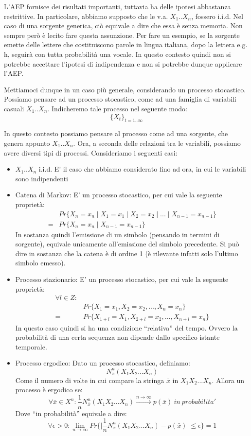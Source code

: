 L'AEP fornisce dei risultati importanti, tuttavia ha delle ipotesi abbastanza restrittive. In particolare, abbiamo supposto che le v.a. 
$X_1..X_n$, fossero i.i.d. Nel caso di una sorgente generica, ciò equivale a dire che essa è senza memoria. Non sempre però è lecito fare questa assunzione. Per fare un esempio, se la sorgente emette delle lettere che costituiscono parole in lingua italiana, dopo la lettera e.g. h, seguirà con tutta probabilità una vocale. In questo contesto quindi non si potrebbe accettare l'ipotesi di indipendenza e non si potrebbe dunque applicare l'AEP.

Mettiamoci dunque in un caso più generale, considerando un processo stocastico. Possiamo pensare ad un processo stocastico, come ad una famiglia di variabili casuali $X_1..X_n$. Indicheremo tale processo nel seguente modo:
\[
 \{X_t\}_{t=1..\infty}
\]

In questo contesto possiamo pensare al processo come ad una sorgente, che genera appunto $X_1..X_n$. Ora, a seconda delle relazioni 
tra le variabili, possiamo avere diversi tipi di processi. Consideriamo i seguenti casi:
\begin{itemize}
 \item $X_1..X_n$ i.i.d. E' il caso che abbiamo considerato fino ad ora, in cui le variabili sono indipendenti
 \item Catena di Markov: E' un processo stocastico, per cui vale la seguente proprietà:
  \[\begin{split}
   &Pr\{ X_n=x_n \mid X_1=x_1 \mid X_2=x_2 \mid ... \mid X_{n-1}=x_{n-1}\} \\
   =&Pr\{ X_n=x_n \mid X_{n-1}=x_{n-1} \}
  \end{split}
  \]
  In sostanza quindi l'emissione di un simbolo (pensando in termini di sorgente), equivale unicamente all'emissione del simbolo 
  precedente. Si può dire in sostanza che la catena è di ordine 1 (è rilevante infatti solo l'ultimo simbolo emesso).
 \item Processo stazionario: E' un processo stocastico, per cui vale la seguente proprietà:
 \[\begin{split}
  \forall l \in Z: \\ & Pr\{X_1=x_1, X_2=x_2, ... , X_n=x_n\}  \\
  = &Pr\{X_{1+l}=X_1, X_{2+l}=x_2, ... , X_{n+l}=x_n \}
    \end{split}
 \]
  In questo caso quindi si ha una condizione ``relativa'' del tempo. Ovvero la probabilità di una certa sequenza non dipende dallo
  specifico istante temporale.
 \item Processo ergodico: Dato un processo stocastico, definiamo:
 \[
  N_{\bar{x}}^n(X_1X_2...X_n) 
 \]
  Come il numero di volte in cui compare la stringa $\bar{x}$ in $X_1X_2...X_n$.
  Allora un processo è ergodico se:
 \[
  \forall \bar{x} \in X^n: \frac{1}{n} N_{\bar{x}}^n(X_1X_2...X_n) \xrightarrow{n \to \infty} p(\bar{x}) \ in \ probabilita'
 \]
  Dove ``in probabilità'' equivale a dire:
  \[
   \forall \epsilon > 0: \lim_{n \to \infty} Pr\{ \mid \frac{1}{n} N_{\bar{x}}^n(X_1X_2...X_n) - p(\bar{x})  \mid \le \epsilon\}=1
  \]


\end{itemize}

